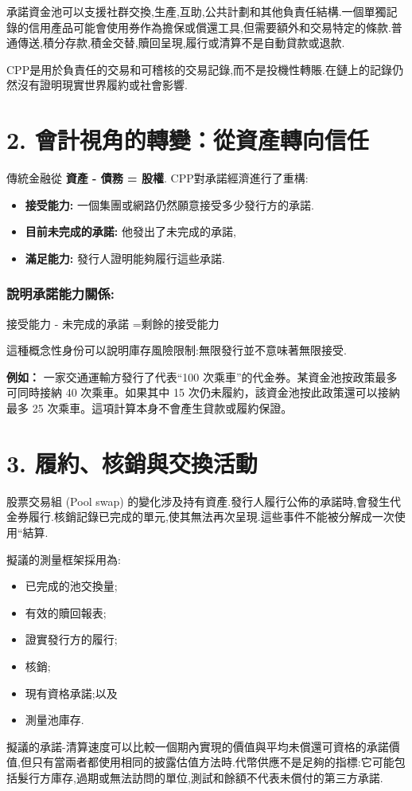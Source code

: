 \documentclass[11pt]{article}
\begin{document}
承諾資金池可以支援社群交換,生產,互助,公共計劃和其他負責任結構.一個單獨記錄的信用產品可能會使用券作為擔保或償還工具,但需要額外和交易特定的條款.普通傳送,積分存款,積金交替,贖回呈現,履行或清算不是自動貸款或退款.

CPP是用於負責任的交易和可稽核的交易記錄,而不是投機性轉賬.在鏈上的記錄仍然沒有證明現實世界履約或社會影響.


\section*{2. 會計視角的轉變：從資產轉向信任}

傳統金融從 \textbf{資產 - 債務 = 股權}. CPP對承諾經濟進行了重構:

\begin{itemize}[leftmargin=*]
\item \textbf{接受能力:} 一個集團或網路仍然願意接受多少發行方的承諾.
\item \textbf{目前未完成的承諾:} 他發出了未完成的承諾,
\item \textbf{滿足能力:} 發行人證明能夠履行這些承諾.
\end{itemize}
\subsubsection*{說明承諾能力關係:}

接受能力 - 未完成的承諾 =剩餘的接受能力

這種概念性身份可以說明庫存風險限制:無限發行並不意味著無限接受.

\textbf{例如：} 一家交通運輸方發行了代表``100 次乘車''的代金券。某資金池按政策最多可同時接納 40 次乘車。如果其中 15 次仍未履約，該資金池按此政策還可以接納最多 25 次乘車。這項計算本身不會產生貸款或履約保證。



\section*{3. 履約、核銷與交換活動}

股票交易組 (Pool swap) 的變化涉及持有資產.發行人履行公佈的承諾時,會發生代金券履行.核銷記錄已完成的單元,使其無法再次呈現.這些事件不能被分解成一次使用``結算.

擬議的測量框架採用為:

\begin{itemize}[leftmargin=*]
\item 已完成的池交換量;
\item 有效的贖回報表;
\item 證實發行方的履行;
\item 核銷;
\item 現有資格承諾;以及
\item 測量池庫存.
\end{itemize}
擬議的承諾-清算速度可以比較一個期內實現的價值與平均未償還可資格的承諾價值,但只有當兩者都使用相同的披露估值方法時.代幣供應不是足夠的指標:它可能包括髮行方庫存,過期或無法訪問的單位,測試和餘額不代表未償付的第三方承諾.
\end{document}
